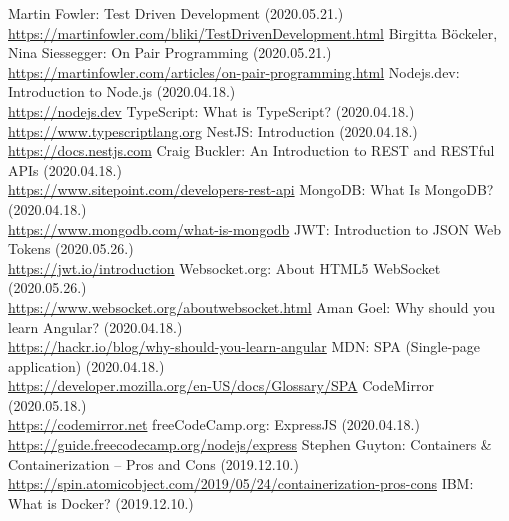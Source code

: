 \documentclass{elteikthesis}
\begin{document}
	\begin{thebibliography}{99}
		\setlength{\itemsep}{0.25em}


			Martin Fowler: Test Driven Development (2020.05.21.)
			\\\url{https://martinfowler.com/bliki/TestDrivenDevelopment.html}
			Birgitta Böckeler, Nina Siessegger: On Pair Programming (2020.05.21.)
			\\\url{https://martinfowler.com/articles/on-pair-programming.html}
			Nodejs.dev: Introduction to Node.js (2020.04.18.)
			\\\url{https://nodejs.dev}
			TypeScript: What is TypeScript? (2020.04.18.)
			\\\url{https://www.typescriptlang.org}
			NestJS: Introduction (2020.04.18.)
			\\\url{https://docs.nestjs.com}
			Craig Buckler: An Introduction to REST and RESTful APIs (2020.04.18.)
			\\\url{https://www.sitepoint.com/developers-rest-api}
			MongoDB: What Is MongoDB? (2020.04.18.)
			\\\url{https://www.mongodb.com/what-is-mongodb}
			JWT: Introduction to JSON Web Tokens (2020.05.26.)
			\\\url{https://jwt.io/introduction}
			Websocket.org: About HTML5 WebSocket (2020.05.26.)
			\\\url{https://www.websocket.org/aboutwebsocket.html}
			Aman Goel: Why should you learn Angular? (2020.04.18.)
			\\\url{https://hackr.io/blog/why-should-you-learn-angular}
			MDN: SPA (Single-page application) (2020.04.18.)
			\\\url{https://developer.mozilla.org/en-US/docs/Glossary/SPA}
			CodeMirror (2020.05.18.)
			\\\url{https://codemirror.net}
			freeCodeCamp.org: ExpressJS (2020.04.18.)
			\\\url{https://guide.freecodecamp.org/nodejs/express}
			Stephen Guyton: Containers \& Containerization – Pros and Cons (2019.12.10.)
			\\\url{https://spin.atomicobject.com/2019/05/24/containerization-pros-cons}
			IBM: What is Docker? (2019.12.10.)

\end{thebibliography}
\end{document}
